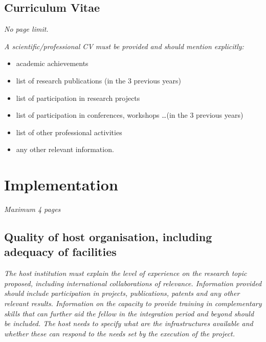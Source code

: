 \documentclass[a4paper,11pt]{article}
\newenvironment{xcomment}{\em}{}
\begin{document}
\subsection{Curriculum Vitae}
\begin{xcomment}
  No page limit.
\end{xcomment}

\begin{xcomment}
A scientific/professional CV must be provided and should mention explicitly:
\begin{itemize}
\item academic achievements
\item list of research publications (in the 3 previous years)
\item list of participation in research projects
\item list of participation in conferences, workshops \dots (in the 3 previous years)
\item list of other professional activities
\item any other relevant information.
\end{itemize}      
\end{xcomment}



\newpage
\section{Implementation}
\begin{xcomment}  
Maximum 4 pages
\end{xcomment}

\subsection{Quality of host organisation, including adequacy of facilities}

\begin{xcomment}
The host institution must explain the level of experience on the
research topic proposed, including international collaborations of
relevance. Information provided should include participation in
projects, publications, patents and any other relevant
results. Information on the capacity to provide training in
complementary skills that can further aid the fellow in the
integration period and beyond should be included. The host needs to
specify what are the infrastructures available and whether these can
respond to the needs set by the execution of the project.
\end{xcomment}
\end{document}
